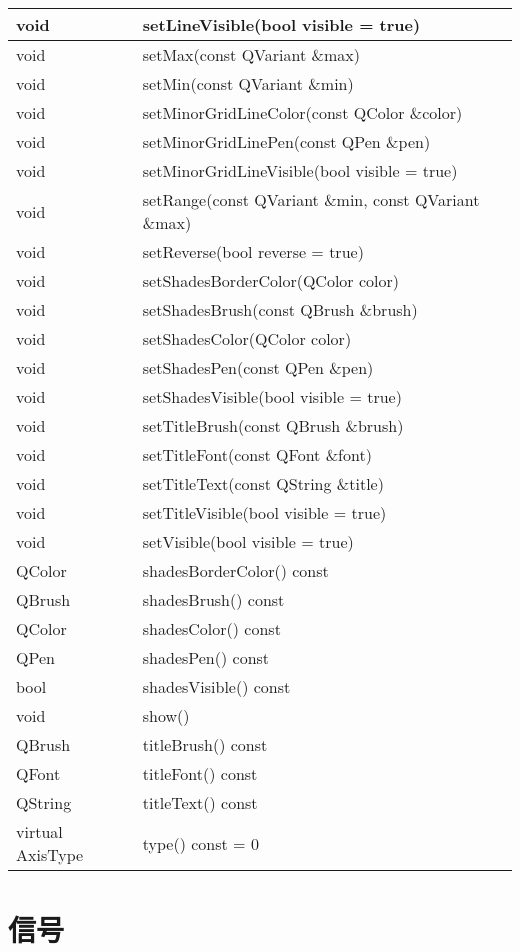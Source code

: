 \begin{longtable}[l]{|l|l|}
\hline
void	&setLineVisible(bool visible = true)\\
\hline
void	&setMax(const QVariant \&max)\\
\hline
void	&setMin(const QVariant \&min)\\
\hline
void	&setMinorGridLineColor(const QColor \&color)\\
\hline
void	&setMinorGridLinePen(const QPen \&pen)\\
\hline
void	&setMinorGridLineVisible(bool visible = true)\\
\hline
void	&setRange(const QVariant \&min, const QVariant \&max)\\
\hline
void	&setReverse(bool reverse = true)\\
\hline
void	&setShadesBorderColor(QColor color)\\
\hline
void	&setShadesBrush(const QBrush \&brush)\\
\hline
void	&setShadesColor(QColor color)\\
\hline
void	&setShadesPen(const QPen \&pen)\\
\hline
void&	setShadesVisible(bool visible = true)\\
\hline
void&	setTitleBrush(const QBrush \&brush)\\
\hline
void&	setTitleFont(const QFont \&font)\\
\hline
void&	setTitleText(const QString \&title)\\
\hline
void&	setTitleVisible(bool visible = true)\\
\hline
void&	setVisible(bool visible = true)\\
\hline
QColor&	shadesBorderColor() const\\
\hline
QBrush&	shadesBrush() const\\
\hline
QColor&	shadesColor() const\\
\hline
QPen&	shadesPen() const\\
\hline
bool&	shadesVisible() const\\
\hline
void&	show()\\
\hline
QBrush&	titleBrush() const\\
\hline
QFont&	titleFont() const\\
\hline
QString&	titleText() const\\
\hline
virtual AxisType &type() const = 0\\
\hline
\end{longtable}

\section{信号}

